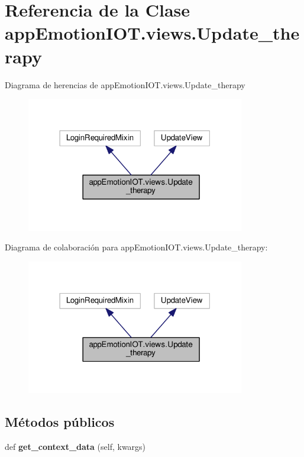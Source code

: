 \hypertarget{classappEmotionIOT_1_1views_1_1Update__therapy}{}\section{Referencia de la Clase app\+Emotion\+I\+O\+T.\+views.\+Update\+\_\+therapy}
\label{classappEmotionIOT_1_1views_1_1Update__therapy}


Diagrama de herencias de app\+Emotion\+I\+O\+T.\+views.\+Update\+\_\+therapy
\nopagebreak
\begin{figure}[H]
\begin{center}
\leavevmode
\includegraphics[width=270pt]{classappEmotionIOT_1_1views_1_1Update__therapy__inherit__graph}
\end{center}
\end{figure}


Diagrama de colaboración para app\+Emotion\+I\+O\+T.\+views.\+Update\+\_\+therapy\+:
\nopagebreak
\begin{figure}[H]
\begin{center}
\leavevmode
\includegraphics[width=270pt]{classappEmotionIOT_1_1views_1_1Update__therapy__coll__graph}
\end{center}
\end{figure}
\subsection*{Métodos públicos}
\begin{DoxyCompactItemize}
\item 
def {\bfseries get\+\_\+context\+\_\+data} (self, kwargs)\hypertarget{classappEmotionIOT_1_1views_1_1Update__therapy_a24abe19bff3e6c14688503f3338a78e3}{}\label{classappEmotionIOT_1_1views_1_1Update__therapy_a24abe19bff3e6c14688503f3338a78e3}

\end{DoxyCompactItemize}
